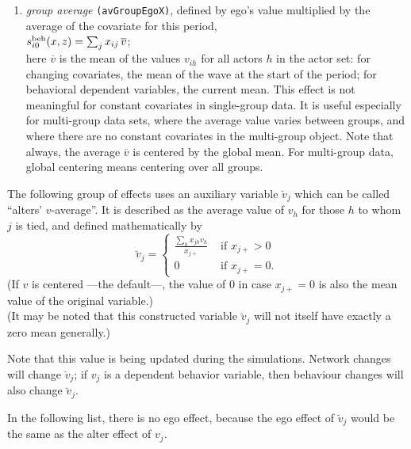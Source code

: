 \documentclass[a4paper,fleqn,11pt]{article}
\newcommand{\+}{\, + \,}
\newcommand{\vit}{\theenumi}
\newcounter{savenumi}
\begin{document}
\begin{enumerate}
\setcounter{savenumi}{\value{enumi}}

 \item {\em group average} \texttt{(avGroupEgoX)}, defined by ego's value multiplied by the
 average of the covariate for this period,  \\
 $s^{\rm beh}_{i\vit}(x, z) =  \sum_j x_{ij} \, \overline {v}  $;\\
 here $\overline {v}$ is the mean of the values $v_{ih}$ for all actors $h$
 in the actor set: for changing covariates, the mean of the wave at the
 start of the period; for behavioral dependent variables,
 the current mean.
 This effect is not meaningful for constant covariates in single-group data.
 It is useful especially for multi-group data sets, where the average value
 varies between groups, and where there are no constant covariates
 in the multi-group object.
 Note that always, the average $\overline {v} $ is centered by the global mean.
 For multi-group data, global centering means centering over all groups.
\end{enumerate}

\noindent
The following group of effects uses an auxiliary variable $\breve v_j$ which
can be called ``alters' $v$-average''.
It is described as the average value of $v_h$ for those $h$
to whom $j$ is tied, and defined mathematically by
\begin{equation}
  \breve v_j = \left\{\begin{array}{ll} \displaystyle
         \frac{\sum_h x_{jh}v_h}{x_{j+}}  &  \text{ if } x_{j+} > 0     \\
         0                                &  \text{ if } x_{j+} = 0  .
  \end{array}   \right.            \label{alt_av}
\end{equation}
(If $v$ is centered ---the default---, the value of 0 in case $x_{j+} = 0$
is also the mean value of the original variable.)\\
(It may be noted that this constructed variable $\breve v_j$
will not itself have exactly a zero mean generally.)

Note that this value is being updated during the simulations.
Network changes will change $\breve v_j$; if $v_j$ is a dependent behavior
variable, then behaviour changes will also change $\breve v_j$.

In the following list, there is no ego effect, because the ego effect
of $\breve v_j$ would be the same as the alter effect of $v_j$.
\end{document}
